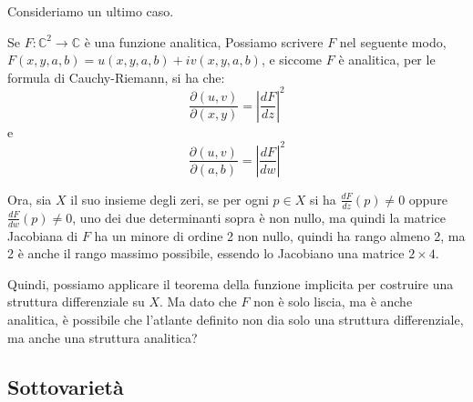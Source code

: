 \documentclass[12pt, a4paper]{article}
\theoremstyle{definition}
\begin{document}
Consideriamo un ultimo caso.

Se $F : \mathbb{C}^2 \to \mathbb{C}$ è una funzione analitica, Possiamo scrivere $F$ nel seguente modo, $F(x, y, a, b) = u(x, y, a, b) + iv(x, y, a, b)$, e siccome $F$ è analitica,
per le formula di Cauchy-Riemann, si ha che:
$$\frac{\partial(u, v)}{\partial(x, y)} = \left|\frac{dF}{dz}\right|^2$$
e
$$\frac{\partial(u, v)}{\partial(a, b)} = \left|\frac{dF}{dw}\right|^2$$

Ora, sia $X$ il suo insieme degli zeri, se per ogni $p \in X$ si ha $\frac{dF}{dz}(p) \neq 0$ oppure $\frac{dF}{dw}(p) \neq 0$, uno dei due determinanti sopra è non nullo,
ma quindi la matrice Jacobiana di $F$ ha un minore di ordine 2 non nullo, quindi ha rango almeno 2, ma 2 è anche il rango massimo possibile, essendo lo Jacobiano una matrice $2 \times 4$.

Quindi, possiamo applicare il teorema della funzione implicita per costruire una struttura differenziale su $X$. Ma dato che $F$ non è solo liscia, ma è anche analitica, è possibile
che l'atlante definito non dia solo una struttura differenziale, ma anche una struttura analitica?

\subsection{Sottovarietà}
\end{document}
